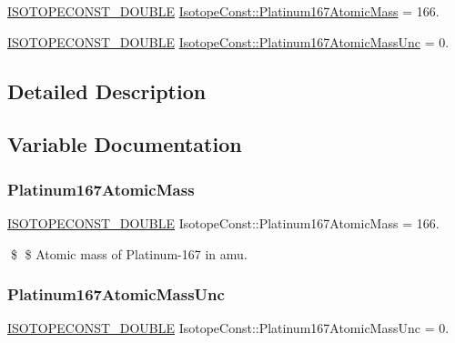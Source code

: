 \begin{DoxyCompactItemize}
\item 
\mbox{\hyperlink{group___isotope_const-_macros_ga8f45a7272ce02c0b4c65c44636ed719a}{I\+S\+O\+T\+O\+P\+E\+C\+O\+N\+S\+T\+\_\+\+D\+O\+U\+B\+LE}} \mbox{\hyperlink{group___isotope_const-_platinum-_pt167_gabc9b6bc5798c6d94e9e1fd49a5ffb084}{Isotope\+Const\+::\+Platinum167\+Atomic\+Mass}} = 166.
\item 
\mbox{\hyperlink{group___isotope_const-_macros_ga8f45a7272ce02c0b4c65c44636ed719a}{I\+S\+O\+T\+O\+P\+E\+C\+O\+N\+S\+T\+\_\+\+D\+O\+U\+B\+LE}} \mbox{\hyperlink{group___isotope_const-_platinum-_pt167_ga52d79eb7e1018f61f154e26912511f33}{Isotope\+Const\+::\+Platinum167\+Atomic\+Mass\+Unc}} = 0.
\end{DoxyCompactItemize}


\subsection{Detailed Description}


\subsection{Variable Documentation}
\mbox{\label{group___isotope_const-_platinum-_pt167_gabc9b6bc5798c6d94e9e1fd49a5ffb084}} 
\subsubsection{\texorpdfstring{Platinum167\+Atomic\+Mass}{Platinum167AtomicMass}}
{\footnotesize\ttfamily \mbox{\hyperlink{group___isotope_const-_macros_ga8f45a7272ce02c0b4c65c44636ed719a}{I\+S\+O\+T\+O\+P\+E\+C\+O\+N\+S\+T\+\_\+\+D\+O\+U\+B\+LE}} Isotope\+Const\+::\+Platinum167\+Atomic\+Mass = 166.}

\$ \$ Atomic mass of Platinum-\/167 in amu. \mbox{\label{group___isotope_const-_platinum-_pt167_ga52d79eb7e1018f61f154e26912511f33}} 
\subsubsection{\texorpdfstring{Platinum167\+Atomic\+Mass\+Unc}{Platinum167AtomicMassUnc}}
{\footnotesize\ttfamily \mbox{\hyperlink{group___isotope_const-_macros_ga8f45a7272ce02c0b4c65c44636ed719a}{I\+S\+O\+T\+O\+P\+E\+C\+O\+N\+S\+T\+\_\+\+D\+O\+U\+B\+LE}} Isotope\+Const\+::\+Platinum167\+Atomic\+Mass\+Unc = 0.}

